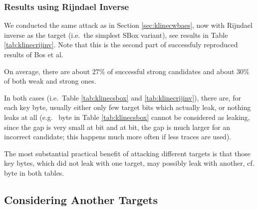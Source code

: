 \subsubsection{Results using Rijndael Inverse}
	
	We conducted the same attack as in Section \ref{sec:klinecwbaes}, now with Rijndael inverse as the target (i.e.\ the simplest SBox variant), see results in Table \ref{tab:klinecrijinv}. Note that this is the second part of successfuly reproduced results of Bos et al.
	
	
	On average, there are about $27\%$ of successful strong candidates and about $30\%$ of both weak and strong ones.
	
	In both cases (i.e.\ Table \ref{tab:klinecsbox} and \ref{tab:klinecrijinv}), there are, for each key byte, usually either only few target bits which actually leak, or nothing leaks at all (e.g.\  byte in Table \ref{tab:klinecsbox} cannot be considered as leaking, since the gap is very small at  bit and at  bit, the gap is much larger for an incorrect candidate; this happens much more often if less traces are used).
	
	The most substantial practical benefit of attacking different targets is that those key bytes, which did not leak with one target, may possibly leak with another, cf.  byte in both tables.



\subsection{Considering Another Targets}
\label{sec:16targets}

